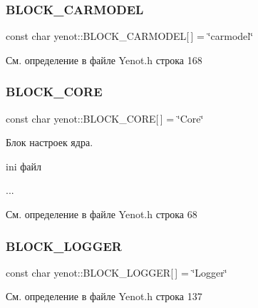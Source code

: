 \subsubsection{\texorpdfstring{B\+L\+O\+C\+K\+\_\+\+C\+A\+R\+M\+O\+D\+EL}{BLOCK\_CARMODEL}}
{\footnotesize\ttfamily const char yenot\+::\+B\+L\+O\+C\+K\+\_\+\+C\+A\+R\+M\+O\+D\+EL\mbox{[}$\,$\mbox{]} = \char`\"{}carmodel\char`\"{}}



См. определение в файле Yenot.\+h строка 168

\mbox{\label{namespaceyenot_a2172a9f506029215b790a51a4023e1ac}} 
\subsubsection{\texorpdfstring{B\+L\+O\+C\+K\+\_\+\+C\+O\+RE}{BLOCK\_CORE}}
{\footnotesize\ttfamily const char yenot\+::\+B\+L\+O\+C\+K\+\_\+\+C\+O\+RE\mbox{[}$\,$\mbox{]} = \char`\"{}Core\char`\"{}}

Блок настроек ядра.

ini файл 
\begin{DoxyCode}
[core]
...
\end{DoxyCode}
 

См. определение в файле Yenot.\+h строка 68

\mbox{\label{namespaceyenot_a73be0cdcde2af378cd4043f56d4776e2}} 
\subsubsection{\texorpdfstring{B\+L\+O\+C\+K\+\_\+\+L\+O\+G\+G\+ER}{BLOCK\_LOGGER}}
{\footnotesize\ttfamily const char yenot\+::\+B\+L\+O\+C\+K\+\_\+\+L\+O\+G\+G\+ER\mbox{[}$\,$\mbox{]} = \char`\"{}Logger\char`\"{}}



См. определение в файле Yenot.\+h строка 137

\mbox{\label{namespaceyenot_a08846c7b8addedd4db68b5cf3721bda1}} 
